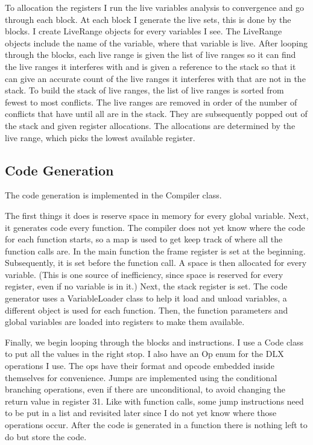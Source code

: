 To allocation the registers I run the live variables analysis to convergence and go through each block. At each block I generate the live sets, this is done by the blocks. I create LiveRange objects for every variables I see. The LiveRange objects include the name of the variable, where that variable is live. After looping through the blocks, each live range is given the list of live ranges so it can find the live ranges it interferes with and is given a reference to the stack so that it can give an accurate count of the live ranges it interferes with that are not in the stack. To build the stack of live ranges, the list of live ranges is sorted from fewest to most conflicts. The live ranges are removed in order of the number of conflicts that have until all are in the stack. They are subsequently popped out of the stack and given register allocations. The allocations are determined by the live range, which picks the lowest available register. 

\subsection*{Code Generation}
The code generation is implemented in the Compiler class. 

The first things it does is reserve space in memory for every global variable. Next, it generates code every function. The compiler does not yet know where the code for each function starts, so a map is used to get keep track of where all the function calls are. In the main function the frame register is set at the beginning. Subsequently, it is set before the function call. A space is then allocated for every variable. (This is one source of inefficiency, since space is reserved for every register, even if no variable is in it.) Next, the stack register is set. The code generator uses a VariableLoader class to help it load and unload variables, a different object is used for each function. Then, the function parameters and global variables are loaded into registers to make them available. 


Finally, we begin looping through the blocks and instructions. I use a Code class to put all the values in the right stop. I also have an Op enum for the DLX operations I use. The ops have their format and opcode embedded inside themselves for convenience. Jumps are implemented using the conditional branching operations, even if there are unconditional, to avoid changing the return value in register 31. Like with function calls, some jump instructions need to be put in a list and revisited later since I do not yet know where those operations occur. After the code is generated in a function there is nothing left to do but store the code. 

